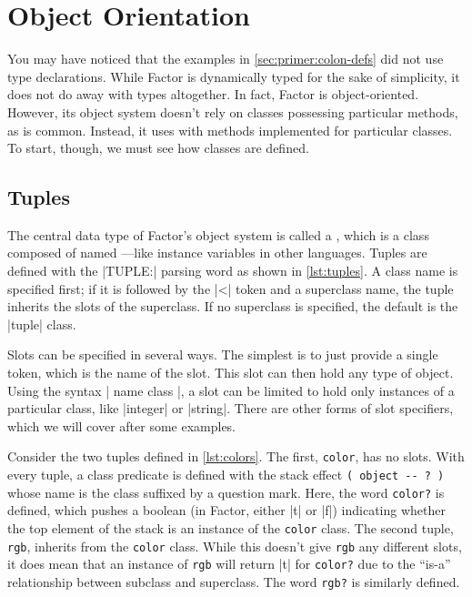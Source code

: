 \section{Object Orientation}\label{sec:primer:oo}

You may have noticed that the examples in \cref{sec:primer:colon-defs} did not
use type declarations.  While Factor is dynamically typed for the sake of
simplicity, it does not do away with types altogether.  In fact, Factor is
object-oriented.  However, its object system doesn't rely on classes possessing
particular methods, as is common.  Instead, it uses  with
methods implemented for particular classes.  To start, though, we must see how
classes are defined.

\subsection{Tuples}


The central data type of Factor's object system is called a , which
is a class composed of named ---like instance variables in other
languages.  Tuples are defined with the \factor|TUPLE:| parsing word as shown
in \cref{lst:tuples}.  A class name is specified first; if it is followed by
the \factor|<| token and a superclass name, the tuple inherits the slots of the
superclass.  If no superclass is specified, the default is the \factor|tuple|
class.

Slots can be specified in several ways.  The simplest is to just provide a
single token, which is the name of the slot.  This slot can then hold any type
of object.  Using the syntax
%
\factor|{ name class }|,
%
a slot can be limited to hold only instances of a particular class, like
\factor|integer| or \factor|string|.  There are other forms of slot specifiers,
which we will cover after some examples.


Consider the two tuples defined in \cref{lst:colors}.  The first,
\Verb|color|, has no slots.  With every tuple, a class predicate is defined
with the stack effect
%
\verb|( object -- ? )|
%
whose name is the class suffixed by a question mark.  Here, the word
\Verb|color?| is defined, which pushes a boolean (in Factor, either
\factor|t| or \factor|f|) indicating whether the top element of the stack is an
instance of the \Verb|color| class.  The second tuple, \Verb|rgb|, inherits
from the \Verb|color| class.  While this doesn't give \Verb|rgb| any
different slots, it does mean that an instance of \Verb|rgb| will return
\factor|t| for \Verb|color?| due to the ``is-a'' relationship between
subclass and superclass.  The word \Verb|rgb?| is similarly defined.

